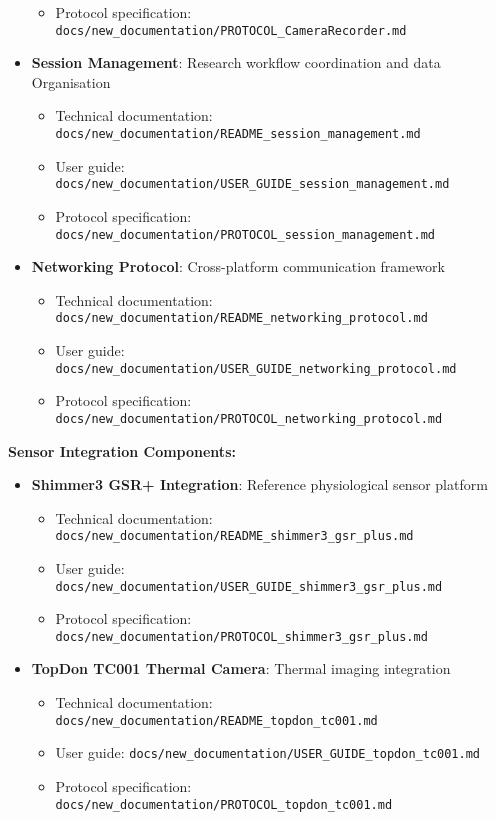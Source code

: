 \documentclass[11pt,a4paper]{report}
\begin{document}
\begin{itemize}
\begin{itemize}
      \item Protocol specification: \texttt{docs/new\_documentation/PROTOCOL\_CameraRecorder.md}
    \end{itemize}
  \item \textbf{Session Management}: Research workflow coordination and data Organisation  
    \begin{itemize}
      \item Technical documentation: \texttt{docs/new\_documentation/README\_session\_management.md}
      \item User guide: \texttt{docs/new\_documentation/USER\_GUIDE\_session\_management.md}
      \item Protocol specification: \texttt{docs/new\_documentation/PROTOCOL\_session\_management.md}
    \end{itemize}
  \item \textbf{Networking Protocol}: Cross-platform communication framework  
    \begin{itemize}
      \item Technical documentation: \texttt{docs/new\_documentation/README\_networking\_protocol.md}
      \item User guide: \texttt{docs/new\_documentation/USER\_GUIDE\_networking\_protocol.md}
      \item Protocol specification: \texttt{docs/new\_documentation/PROTOCOL\_networking\_protocol.md}
    \end{itemize}
\end{itemize}

\textbf{Sensor Integration Components:}
\begin{itemize}
  \item \textbf{Shimmer3 GSR+ Integration}: Reference physiological sensor platform  
    \begin{itemize}
      \item Technical documentation: \texttt{docs/new\_documentation/README\_shimmer3\_gsr\_plus.md}
      \item User guide: \texttt{docs/new\_documentation/USER\_GUIDE\_shimmer3\_gsr\_plus.md}
      \item Protocol specification: \texttt{docs/new\_documentation/PROTOCOL\_shimmer3\_gsr\_plus.md}
    \end{itemize}
  \item \textbf{TopDon TC001 Thermal Camera}: Thermal imaging integration  
    \begin{itemize}
      \item Technical documentation: \texttt{docs/new\_documentation/README\_topdon\_tc001.md}
      \item User guide: \texttt{docs/new\_documentation/USER\_GUIDE\_topdon\_tc001.md}
      \item Protocol specification: \texttt{docs/new\_documentation/PROTOCOL\_topdon\_tc001.md}
    \end{itemize}
\end{itemize}
\end{document}
